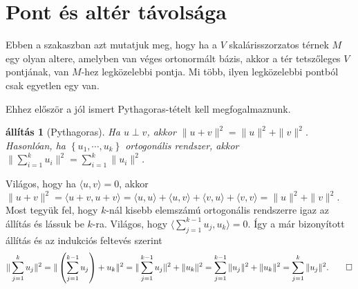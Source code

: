 \documentclass[9pt, a4paper, showtrims]{memoir}
\makeatletter
\renewenvironment{proof}[1][\proofname]
    {\par\pushQED{\qed}%
    \normalfont \topsep6\p@\@plus6\p@\relax
    \trivlist
    \item[\hskip\labelsep
        \itshape
    #1\@addpunct{:}]\ignorespaces}
    {\popQED\endtrivlist\@endpefalse}
\theoremstyle{plain}
\newtheorem{proposition}{állítás}[chapter]
\theoremstyle{remark}
\theoremstyle{definition}
\newcommand{\ip}[2]{\langle#1,#2\rangle}
\makeatother
\begin{document}
\section{Pont és altér távolsága}
Ebben a szakaszban azt mutatjuk meg, hogy ha a $V$ skalárisszorzatos térnek $M$ egy olyan
altere, amelyben van véges ortonormált bázis, akkor a tér tetszőleges $V$ pontjának,
van $M$-hez legközelebbi pontja.
Mi több, ilyen legközelebbi pontból csak egyetlen egy van.

Ehhez először a jól ismert Pythagoras-tételt kell megfogalmaznunk.

\begin{proposition}[Pythagoras]
	Ha $u\perp v$, akkor $\|u+v\|^2=\|u\|^2+\|v\|^2$.
	Hasonlóan, ha $\left\{ u_1,\cdots,u_k \right\}$ ortogonális rendszer, akkor
	$\|\sum_{i=1}^ku_i\|^2=\sum_{i=1}^k\|u_i\|^2$.
\end{proposition}
\begin{proof}
	Világos, hogy ha $\ip{u}{v}=0$,
	akkor
	\begin{math}
		\|u+v\|^2
		=
		\ip{u+v}{u+v}
		=\ip{u}{u}+\ip{u}{v}+\ip{v}{u}+\ip{v}{v}
		=
		\|u\|^2+\|v\|^2.
	\end{math}
	Most tegyük fel, hogy $k$-nál kisebb elemszámú ortogonális rendszerre igaz az állítás
	és lássuk be $k$-ra.
	Világos, hogy
	\begin{math}
		\ip{\sum_{j=1}^{k-1}u_j}{u_k}=0.
	\end{math}
	Így a már bizonyított állítás és az indukciós feltevés szerint
	\[
		\|\sum_{j=1}^ku_j\|^2
		=
		\|\left( \sum_{j=1}^{k-1}u_j \right)+u_k\|^2
		=
		\|\sum_{j=1}^{k-1}u_j\|^2+\|u_k\|^2
		=
		\sum_{j=1}^{k-1}\|u_j\|^2+\|u_k\|^2
		=
		\sum_{j=1}^k\|u_j\|^2.
		\qedhere
	\]
\end{proof}
\end{document}
